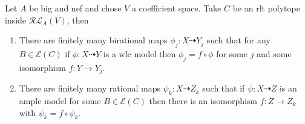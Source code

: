 	\begin{theorem}\label{weak finiteness}
		Let $A$ be big and nef and chose $V$ a coefficient space. Take $C$ be an rlt polytope inside $\mathcal{RL}_{A}(V)$, then
		
		\begin{enumerate}
			\item There are finitely many birational maps $\phi_{j}: X \dashrightarrow Y_{j}$ such that for any $B \in \mathcal{E}(C)$ if $\phi: X \dashrightarrow Y$ is a wlc model then $\phi_{j}=f \circ \phi$ for some $j$ and some isomorphism $f: Y \to Y_{j}$. \\
			\item There are finitely many rational maps $\psi_{k}: X \dashrightarrow Z_{k}$ such that if $\psi:X \dashrightarrow Z$ is an ample model for some $B \in \mathcal{E}(C)$ then there is an isomorphism $f:Z \to Z_{k}$ with $\psi_{k}=f \circ \psi_{k}$.
		\end{enumerate}
	\end{theorem}
	
